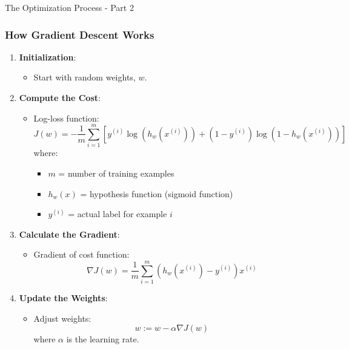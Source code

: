 \documentclass[aspectratio=169]{beamer}
\begin{document}
\begin{frame}[fragile]{The Optimization Process - Part 2}
    \frametitle{How Gradient Descent Works}

    \begin{enumerate}
        \item \textbf{Initialization}:
            \begin{itemize}
                \item Start with random weights, \( w \).
            \end{itemize}
        
        \item \textbf{Compute the Cost}:
            \begin{itemize}
                \item Log-loss function:
                \begin{equation}
                J(w) = -\frac{1}{m} \sum_{i=1}^{m} \left[ y^{(i)} \log(h_w(x^{(i)})) + (1 - y^{(i)}) \log(1 - h_w(x^{(i)})) \right]
                \end{equation}
                where:
                \begin{itemize}
                    \item \( m \) = number of training examples
                    \item \( h_w(x) \) = hypothesis function (sigmoid function)
                    \item \( y^{(i)} \) = actual label for example \(i\)
                \end{itemize}
            \end{itemize}

        \item \textbf{Calculate the Gradient}: 
            \begin{itemize}
                \item Gradient of cost function:
                \begin{equation}
                \nabla J(w) = \frac{1}{m} \sum_{i=1}^{m} (h_w(x^{(i)}) - y^{(i)}) x^{(i)}
                \end{equation}
            \end{itemize}
        
        \item \textbf{Update the Weights}:
            \begin{itemize}
                \item Adjust weights:
                \begin{equation}
                w := w - \alpha \nabla J(w)
                \end{equation}
                where \( \alpha \) is the learning rate.
            \end{itemize}
    \end{enumerate}
\end{frame}
\end{document}
